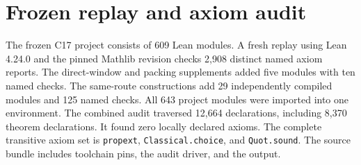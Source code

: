 \documentclass[
  11pt,
]{article}
\begin{document}
\appendix
\section{Frozen replay and axiom audit}\label{app:frozen-replay-audit}
The frozen C17 project consists of 609 Lean modules. A fresh replay using Lean 4.24.0 and the pinned Mathlib revision checks 2,908 distinct named axiom reports. The direct-window and packing supplements added five modules with ten named checks. The same-route constructions add 29 independently compiled modules and 125 named checks. All 643 project modules were imported into one environment. The combined audit traversed 12,664 declarations, including 8,370 theorem declarations. It found zero locally declared axioms. The complete transitive axiom set is \texttt{propext}, \texttt{Classical.choice}, and \texttt{Quot.sound}. The source bundle includes toolchain pins, the audit driver, and the output.
\end{document}
